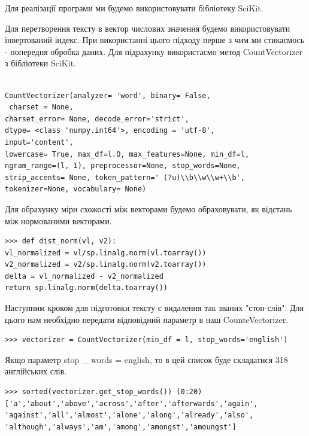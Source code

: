 \documentclass[a4paper,14pt,russian]{extreport}
\begin{document}
Для реалізації програми ми будемо використовувати бібліотеку SciKit.

\par 
Для перетворення тексту в вектор числових значення будемо використовувати  інвертований індекс. При використанні цього підходу перше з чим ми стикаємось -  попередня обробка даних. Для підрахунку використаємо метод CountVectorizer з бібліотеки SciKit. 

\begin{lstlisting}[frame=single]  % Start your code-block

CountVectorizer(analyzer= 'word', binary= False,
 charset = None,
charset_error= None, decode_error='strict',
dtype= <class 'numpy.int64'>, encoding = 'utf-8',
input='content',
lowercase= True, max_df=l.O, max_features=None, min_df=l,
ngram_range=(l, 1), preprocessor=None, stop_words=None,
strip_accents= None, token_pattern=' (?u)\\b\\w\\w+\\b',
tokenizer=None, vocabulary= None)
\end{lstlisting}

Для обрахунку міри схожості між векторами будемо обраховувати, як відстань між нормованими векторами.

\begin{lstlisting}[frame=single]  
>>> def dist_norm(vl, v2):
vl_normalized = vl/sp.linalg.norm(vl.toarray())
v2_normalized = v2/sp.linalg.norm(v2.toarray())
delta = vl_normalized - v2_normalized
return sp.linalg.norm(delta.toarray())
\end{lstlisting}
\par 
Наступним кроком для підготовки тексту є видалення так званих "стоп-слів". Для цього нам необхідно передати відповідний параметр в наш CounteVectorizer.

\begin{lstlisting}[frame=single]  
>>> vectorizer = CountVectorizer(min_df = l, stop_words='english')
\end{lstlisting}
Якщо параметр stop \_ words = english, то в цей список буде складатися 318 англійських слів.

\begin{lstlisting}[frame=single]  
>>> sorted(vectorizer.get_stop_words()) (0:20)
['a','about','above','across','after','afterwards','again',
'against','all','almost','alone','along','already','also',
'although','always','am','among','amongst','amoungst']
\end{lstlisting}
\end{document}
